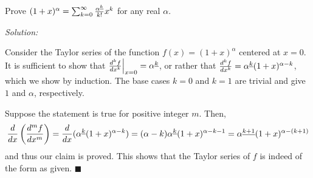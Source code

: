 \documentclass[12pt]{scrartcl}
\newenvironment{problem}[2][Problem]{\begin{trivlist}
\item[\hskip \labelsep {\bfseries #1}\hskip \labelsep {\bfseries #2.}]}{\end{trivlist}}
\newenvironment{solution}
    {\emph{Solution:}
    }
    {
    \qedhere
    }
\begin{document}
\begin{problem}{11}
Prove $(1 + x)^\alpha = \sum^\infty_{k=0} \frac{\alpha^{\underline{k}}}{{k!}} x^k$ for any real $\alpha$. 
\end{problem}

\begin{solution}
Consider the Taylor series of the function $f(x) = (1+x)^\alpha$ centered at $x = 0$. It is sufficient to show that $\frac{d^{k} f}{d x^{k}} \Big|_{x=0} = \alpha^{\underline{k}}$, or rather that $\frac{d^{k} f}{d x^{k}} = \alpha^{\underline{k}} (1+x)^{\alpha-k}$, which we show by induction. The base cases $k=0$ and $k=1$ are trivial and give $1$ and $\alpha$, respectively. 

Suppose the statement is true for positive integer $m$. Then, 
\[
	\frac{d }{d x}\left( \frac{d^{m} f}{d x^{m}}\right) = \frac{d }{d x} (\alpha^{\underline{k}} (1+x)^{\alpha-k}) = (\alpha-k)\alpha^{\underline{k}} (1+x)^{\alpha - k -1} = \alpha^{\underline{k+1}} (1+x)^{\alpha - (k+1)}
\]
and thus our claim is proved. This shows that the Taylor series of $f$ is indeed of the form as given. $\blacksquare$
\end{solution}
\end{document}
